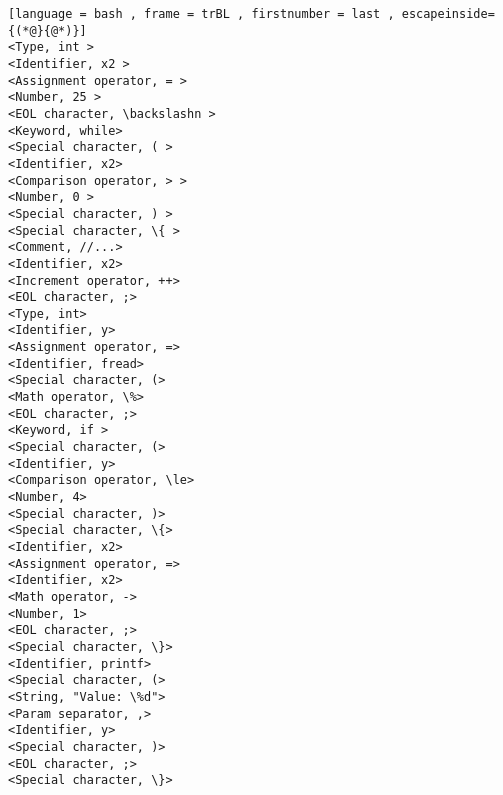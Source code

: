 \begin{lstlisting}[language = bash , frame = trBL , firstnumber = last , escapeinside={(*@}{@*)}]
<Type, int > 
<Identifier, x2 > 
<Assignment operator, = >  
<Number, 25 >  
<EOL character, \backslashn >  
<Keyword, while>  
<Special character, ( > 
<Identifier, x2> 
<Comparison operator, > > 
<Number, 0 >  
<Special character, ) > 
<Special character, \{ > 
<Comment, //...> 
<Identifier, x2>     
<Increment operator, ++> 
<EOL character, ;> 
<Type, int> 
<Identifier, y> 
<Assignment operator, => 
<Identifier, fread> 
<Special character, (> 
<Math operator, \%> 
<EOL character, ;> 
<Keyword, if > 
<Special character, (> 
<Identifier, y> 
<Comparison operator, \le> 
<Number, 4> 
<Special character, )> 
<Special character, \{> 
<Identifier, x2> 
<Assignment operator, => 
<Identifier, x2> 
<Math operator, -> 
<Number, 1> 
<EOL character, ;> 
<Special character, \}> 
<Identifier, printf> 
<Special character, (> 
<String, "Value: \%d"> 
<Param separator, ,> 
<Identifier, y> 
<Special character, )> 
<EOL character, ;>   
<Special character, \}> 
\end{lstlisting}